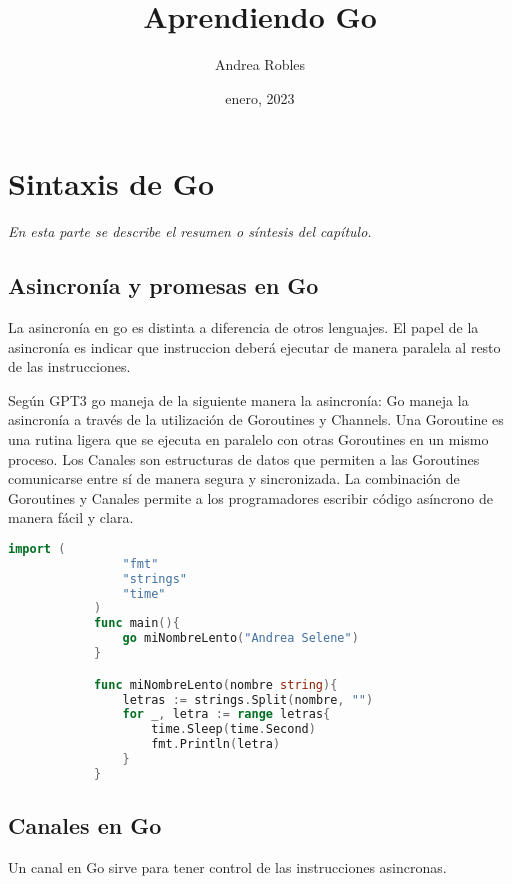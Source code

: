 \documentclass[]{book}
\title{\bf Aprendiendo Go}
\author{Andrea Robles}
\date{enero, 2023}
\begin{document}
\frontmatter
\maketitle
\tableofcontents
\mainmatter
\chapter{Sintaxis de Go}
\begin{center}
\textit{En esta parte se describe el resumen o síntesis
del capítulo.}
\end{center}

\section{Asincronía y promesas en Go}
    \par La asincronía en go es distinta a diferencia de otros lenguajes. El papel de la asincronía es indicar que instruccion deberá ejecutar de manera paralela al resto de las instrucciones.

    \par Según GPT3 go maneja de la siguiente manera la asincronía: Go maneja la asincronía a través de la utilización de Goroutines y Channels. Una Goroutine es una rutina ligera que se ejecuta en paralelo con otras Goroutines en un mismo proceso. Los Canales son estructuras de datos que permiten a las Goroutines comunicarse entre sí de manera segura y sincronizada. La combinación de Goroutines y Canales permite a los programadores escribir código asíncrono de manera fácil y clara.
    \begin{tcolorbox}[
        title = Ejemplo de la asincronia en Go] 
        \begin{lstlisting}[language=go]
            import (
                "fmt"
                "strings"
                "time"
            )
            func main(){
                go miNombreLento("Andrea Selene")
            }

            func miNombreLento(nombre string){
                letras := strings.Split(nombre, "")
                for _, letra := range letras{
                    time.Sleep(time.Second)
                    fmt.Println(letra)
                }
            }
        \end{lstlisting}
    \end{tcolorbox}
\section{Canales en Go}
   \par Un canal en Go sirve para tener control de las instrucciones asincronas.
   \begin{tcolorbox}[
    title = Ejemplo de Canales en Go]
    

   \end{tcolorbox}
\end{document}

